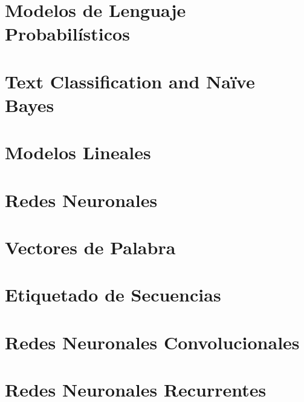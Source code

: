 \documentclass{book}
\begin{document}
\chapter{Modelos de Lenguaje Probabilísticos}
\label{cap_plm}



\chapter{Text Classification and Naïve Bayes}
\label{cap_nb}



\chapter{Modelos Lineales}
\label{cap_lineales}



\chapter{Redes Neuronales}
\label{cap_redes}


\chapter{Vectores de Palabra}
\label{cap_embeddings}


\chapter{Etiquetado de Secuencias}
\label{cap_etisec}




\chapter{Redes Neuronales Convolucionales}
\label{cap_cnn}



\chapter{Redes Neuronales Recurrentes}
\label{cap_rnn}
%

\end{document}
